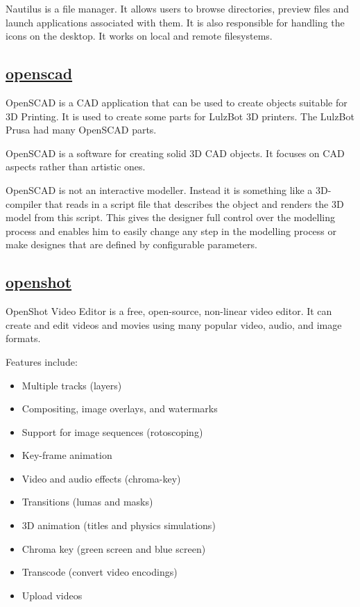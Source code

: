  Nautilus is a file manager. It allows users
 to browse directories, preview files and launch applications associated
 with them. It is also responsible for handling the icons on the
 desktop. It works on local and remote filesystems.
 
\subsection{\href{http://openscad.org/}{openscad}}

OpenSCAD is a CAD application that can be used to create objects suitable for
3D Printing. It is used to create some parts for LulzBot 3D printers. The
LulzBot Prusa had many OpenSCAD parts.

 OpenSCAD is a software for creating solid 3D CAD objects. It focuses on CAD
 aspects rather than artistic ones.
 
 OpenSCAD is not an interactive modeller. Instead it is something like a
 3D-compiler that reads in a script file that describes the object and renders
 the 3D model from this script. This gives the designer full control over the
 modelling process and enables him to easily change any step in the modelling
 process or make designes that are defined by configurable parameters.

\subsection{\href{http://www.openshotvideo.com/}{openshot}}

 OpenShot Video Editor is a free, open-source, non-linear video editor. It
 can create and edit videos and movies using many popular video, audio, and
 image formats.
 
 Features include:

\begin{itemize}
 \item Multiple tracks (layers)
 \item Compositing, image overlays, and watermarks
 \item Support for image sequences (rotoscoping)
 \item Key-frame animation
 \item Video and audio effects (chroma-key)
 \item Transitions (lumas and masks)
 \item 3D animation (titles and physics simulations)
 \item Chroma key (green screen and blue screen)
 \item Transcode (convert video encodings)
 \item Upload videos
\end{itemize}


